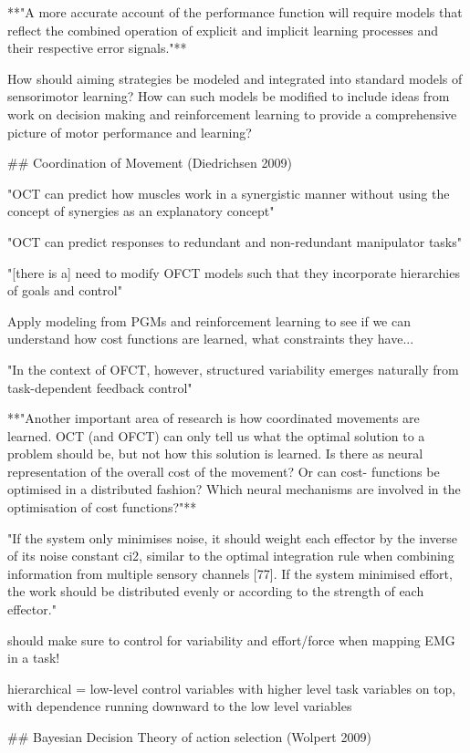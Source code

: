 \documentclass[../main.tex]{subfiles}
\begin{document}
{{**"A more accurate account of the performance function will require models that reflect the combined operation of explicit and implicit learning processes and their respective error signals."**

How should aiming strategies be modeled and integrated into standard models of sensorimotor learning? How can such models be modified to include ideas from work on decision making and reinforcement learning to provide a comprehensive picture of motor performance and learning?

## Coordination of Movement (Diedrichsen 2009)

"OCT can predict how muscles work in a synergistic manner without using the concept of synergies as an explanatory concept"

"OCT can predict responses to redundant and non-redundant manipulator tasks"

"[there is a] need to modify OFCT models such that they incorporate hierarchies of goals and control"

Apply modeling from PGMs and reinforcement learning to see if we can understand how cost functions are learned, what constraints they have...

"In the context of OFCT, however, structured variability emerges naturally from task-dependent feedback control"

**"Another important area of research is how coordinated movements are learned. OCT (and OFCT) can only tell us what the optimal solution to a problem should be, but not how this solution is learned. Is there as neural representation of the overall cost of the movement? Or can cost- functions be optimised in a distributed fashion? Which neural mechanisms are involved in the optimisation of cost functions?"**

"If the system only minimises noise, it should weight each effector by the inverse of its noise constant ci2, similar to the optimal integration rule when combining information from multiple sensory channels [77]. If the system minimised effort, the work should be distributed evenly or according to the strength of each effector."

should make sure to control for variability and effort/force when mapping EMG in a task!

hierarchical = low-level control variables with higher level task variables on top, with dependence running downward to the low level variables

## Bayesian Decision Theory of action selection (Wolpert 2009)

}}
\end{document}
